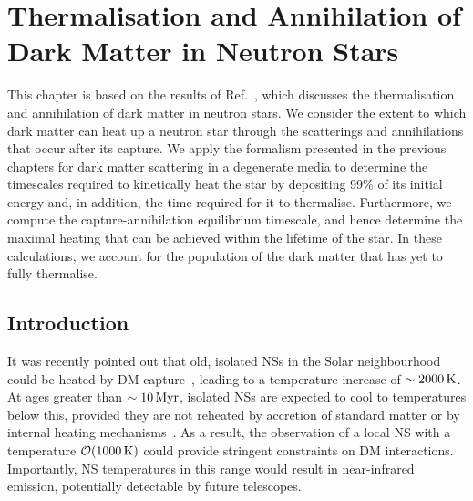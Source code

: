 \graphicspath{{img/thermalisation/}}

\chapter{Thermalisation and Annihilation of Dark Matter in Neutron Stars }
\label{chapter:thermalisation}

\begin{synopsis}
This chapter is based on the results of Ref.~\cite{Bell:2023ysh_dec_ThermalizationAnnihilationDark}, which discusses the thermalisation and annihilation of dark matter in neutron stars. We consider the extent to which dark matter can heat up a neutron star through the scatterings and annihilations that occur after its capture.  We apply the formalism presented in the previous chapters for dark matter scattering in a degenerate media to determine the timescales required to kinetically heat the star by depositing 99\% of its initial energy and, in addition, the time required for it to thermalise. Furthermore, we compute the capture-annihilation equilibrium timescale, and hence determine the maximal heating that can be achieved within the lifetime of the star. In these calculations, we account for the population of the dark matter that has yet to fully thermalise. 
\end{synopsis}




\section{Introduction}
\label{ch6:sec:introduction}

It was recently pointed out that old, isolated NSs in the Solar neighbourhood could be heated by DM capture~\cite{Baryakhtar:2017dbj_sep_DarkKineticHeating}, leading to a temperature increase of $\sim 2000{\rm \,K}$. 
At ages greater than $\sim 10{\rm \,Myr}$, isolated NSs are expected to cool to temperatures below this, provided they are not reheated by accretion of standard matter or by internal heating mechanisms~\cite{Gonzalez:2010ta_Internalheatingold}.
As a result, the observation of a local NS with a temperature $\mathcal{O}(1000{\rm \,K})$ could provide stringent constraints on DM interactions. Importantly,
NS temperatures in this range would result in near-infrared emission, potentially detectable by future telescopes.



